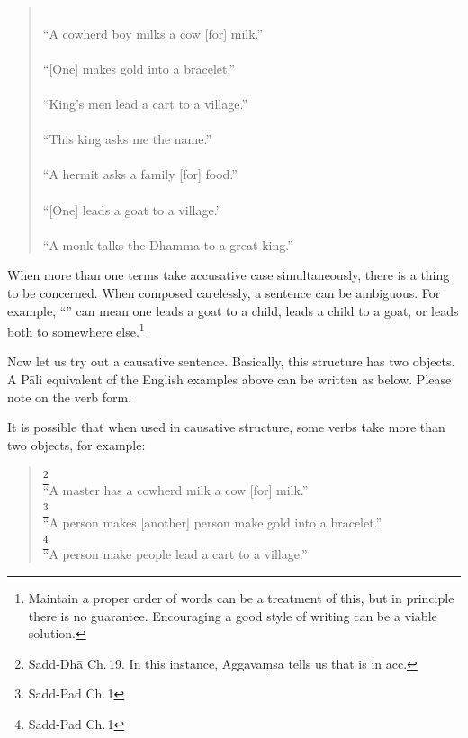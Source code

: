 \begin{quote}
\\
``A cowherd boy milks a cow [for] milk.''\\[1.5mm]
\\
``[One] makes gold into a bracelet.''\\[1.5mm]
\\
``King's men lead a cart to a village.''\\[1.5mm]
\\
``This king asks me the name.''\\[1.5mm]
\\
``A hermit asks a family [for] food.''\\[1.5mm]
\\
``[One] leads a goat to a village.''\\[1.5mm]
\\
``A monk talks the Dhamma to a great king.''\\[1.5mm]
\end{quote}

When more than one terms take accusative case simultaneously, there is a thing to be concerned. When composed carelessly, a sentence can be ambiguous. For example, ``'' can mean one leads a goat to a child, leads a child to a goat, or leads both to somewhere else.\footnote{Maintain a proper order of words can be a treatment of this, but in principle there is no guarantee. Encouraging a good style of writing can be a viable solution.}

Now let us try out a causative sentence. Basically, this structure has two objects. A P\=ali equivalent of the English examples above can be written as below. Please note on the verb form.


It is possible that when used in causative structure, some verbs take more than two objects, for example:

\begin{quote}
\footnote{Sadd-Dh\=a Ch.\,19. In this instance, Aggava\d msa tells us that  is in acc.}\\
``A master has a cowherd milk a cow [for] milk.''\\[1.5mm]
\footnote{Sadd-Pad Ch.\,1}\\
``A person makes [another] person make gold into a bracelet.''\\[1.5mm]
\footnote{Sadd-Pad Ch.\,1}\\
``A person make people lead a cart to a village.''\\[1.5mm]
\end{quote}

